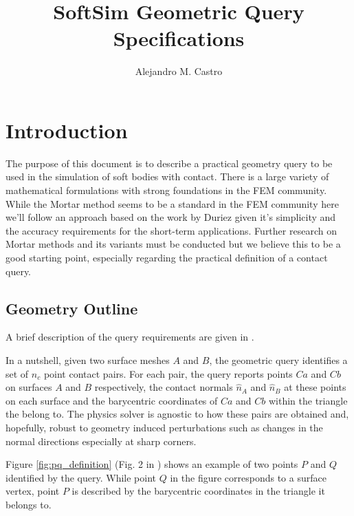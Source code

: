 \documentclass[a4paper]{article}
\title{SoftSim Geometric Query Specifications}
\author{Alejandro M. Castro}
\begin{document}
\maketitle


\section{Introduction}

The purpose of this document is to describe a practical geometry query to be
used in the simulation of soft bodies with contact. There is a large variety of
mathematical formulations with strong foundations in the FEM community. While
the Mortar method seems to be a standard in the FEM community
\cite{bib:yang2005, bib:delorenzis2014, bib:fischer2006, bib:popp2010} here
we'll follow an approach based on the work by Duriez
\cite{bib:duriez2006_realistic_haptic_rendering} given it's simplicity and the
accuracy requirements for the short-term applications. Further research on
Mortar methods and its variants must be conducted but we believe this to be a
good starting point, especially regarding the practical definition of a contact query.

\subsection{Geometry Outline}
A brief description of the query requirements are given in 
\cite[\S 3.2]{bib:duriez2006_realistic_haptic_rendering}.

In a nutshell, given two surface meshes $A$ and $B$, the geometric query identifies a set of
$n_c$ point contact pairs. For each pair, the query reports points $Ca$ and $Cb$
on surfaces $A$ and $B$ respectively, the contact normals $\widehat{n}_A$ and
$\widehat{n}_B$ at these points on each surface and the barycentric coordinates
of $Ca$ and $Cb$ within the triangle the belong to. The physics solver is agnostic to
how these pairs are obtained and, hopefully, robust to geometry induced
perturbations such as changes in the normal directions especially at sharp
corners.

Figure \ref{fig:pq_definition} (Fig. 2 in
\cite{bib:duriez2006_realistic_haptic_rendering}) shows an example of two points
$P$ and $Q$ identified by the query. While point $Q$ in the figure corresponds
to a surface vertex, point $P$ is described by the barycentric coordinates in
the triangle it belongs to.
\end{document}
